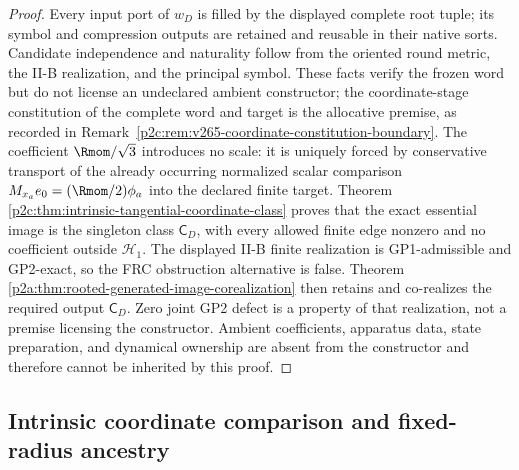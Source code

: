 \documentclass[12pt,a4paper]{article}
\begin{document}
\begin{proof}
Every input port of \(w_D\) is filled by the displayed complete root tuple;
its symbol and compression outputs are retained and reusable in their native
sorts.  Candidate independence and naturality follow from the oriented round
metric, the II-B realization, and the principal symbol.  These facts verify
the frozen word but do not license an undeclared ambient constructor; the
coordinate-stage constitution of the complete word and target is the
allocative premise, as recorded in
Remark~\ref{p2c:rem:v265-coordinate-constitution-boundary}.  The coefficient
\(\Rmom/\sqrt3\) introduces no scale: it is uniquely forced by conservative
transport of the already occurring normalized scalar comparison
\(M_{x_a}e_0=(\Rmom/2)\phi_a\) into the declared finite target.  Theorem~
\ref{p2c:thm:intrinsic-tangential-coordinate-class} proves that the exact
essential image is the singleton class \(\mathsf C_D\), with every allowed
finite edge nonzero and no coefficient outside \(\mathcal H_1\).  The
displayed II-B finite realization is GP1-admissible and GP2-exact, so the FRC
obstruction alternative is false.  Theorem~
\ref{p2a:thm:rooted-generated-image-corealization} then retains and
co-realizes the required output \(\mathsf C_D\).  Zero joint GP2 defect is a
property of that realization, not a premise licensing the constructor.
Ambient coefficients, apparatus data, state preparation, and dynamical
ownership are absent from the constructor and therefore cannot be inherited
by this proof.
\end{proof}

\subsection{Intrinsic coordinate comparison and fixed-radius ancestry}
\end{document}

